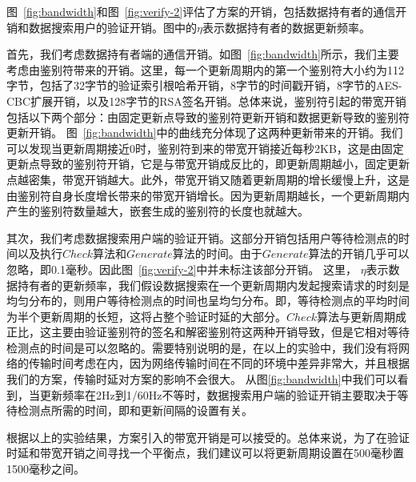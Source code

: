 图~\ref{fig:bandwidth}和图~\ref{fig:verify-2}评估了\multi 方案的开销，包括数据持有者的通信开销和数据搜索用户的验证开销。图中的$\eta$表示数据持有者的数据更新频率。

首先，我们考虑数据持有者端的通信开销。如图~\ref{fig:bandwidth}所示，我们主要考虑由鉴别符带来的开销。这里，每一个更新周期内的第一个鉴别符大小约为112字节，包括了32字节的验证索引根哈希开销，8字节的时间戳开销，8字节的AES-CBC扩展开销，以及128字节的RSA签名开销。总体来说，鉴别符引起的带宽开销包括以下两个部分：由固定更新点导致的鉴别符更新开销和数据更新导致的鉴别符更新开销。
图~\ref{fig:bandwidth}中的曲线充分体现了这两种更新带来的开销。我们可以发现当更新周期接近0时，鉴别符到来的带宽开销接近每秒2KB，这是由固定更新点导致的鉴别符开销，它是与带宽开销成反比的，即更新周期越小，固定更新点越密集，带宽开销越大。此外，带宽开销又随着更新周期的增长缓慢上升，这是由鉴别符自身长度增长带来的带宽开销增长。因为更新周期越长，一个更新周期内产生的鉴别符数量越大，嵌套生成的鉴别符的长度也就越大。

其次，我们考虑数据搜索用户端的验证开销。这部分开销包括用户等待检测点的时间以及执行$Check$算法和$Generate$算法的时间。由于$Generate$算法的开销几乎可以忽略，即0.1毫秒。因此图~\ref{fig:verify-2}中并未标注该部分开销。
这里， $\eta$表示数据持有者的更新频率，我们假设数据搜索在一个更新周期内发起搜索请求的时刻是均匀分布的，则用户等待检测点的时间也呈均匀分布。即，等待检测点的平均时间为半个更新周期的长短，这将占整个验证时延的大部分。$Check$算法与更新周期成正比，这主要由验证鉴别符的签名和解密鉴别符这两种开销导致，但是它相对等待检测点的时间是可以忽略的。需要特别说明的是，在以上的实验中，我们没有将网络的传输时间考虑在内，因为网络传输时间在不同的环境中差异非常大，并且根据我们的方案，传输时延对方案的影响不会很大。
从图\ref{fig:bandwidth}中我们可以看到，当更新频率在2Hz到1/60Hz不等时，数据搜索用户端的验证开销主要取决于等待检测点所需的时间，即和更新间隔的设置有关。

根据以上的实验结果，\multi 方案引入的带宽开销是可以接受的。总体来说，为了在验证时延和带宽开销之间寻找一个平衡点，我们建议可以将更新周期设置在500毫秒置1500毫秒之间。
